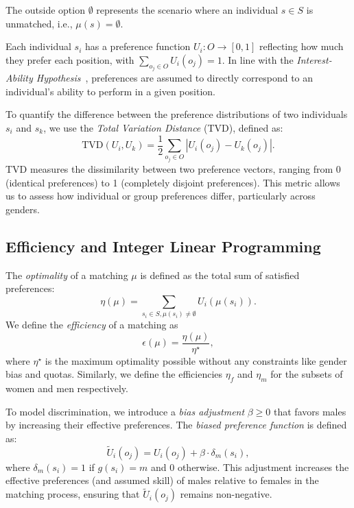 \documentclass[letterpaper]{article}
\begin{document}
The outside option \( \emptyset \) represents the scenario where an individual \( s \in S \) is unmatched, i.e., \( \mu(s) = \emptyset \).

Each individual \( s_i \) has a preference function \( U_i : O \to [0, 1] \) reflecting how much they prefer each position, with \( \sum_{o_j \in O} U_i(o_j) = 1 \). In line with the \textit{Interest-Ability Hypothesis}~\cite{jintelligence10030043}, preferences are assumed to directly correspond to an individual's ability to perform in a given position.

To quantify the difference between the preference distributions of two individuals \( s_i \) and \( s_k \), we use the \textit{Total Variation Distance} (TVD), defined as:
\[
\text{TVD}(U_i, U_k) = \frac{1}{2} \sum_{o_j \in O} \left| U_i(o_j) - U_k(o_j) \right|.
\]
TVD measures the dissimilarity between two preference vectors, ranging from 0 (identical preferences) to 1 (completely disjoint preferences). This metric allows us to assess how individual or group preferences differ, particularly across genders.

\subsection*{Efficiency and Integer Linear Programming}

The \textit{optimality} of a matching \( \mu \) is defined as the total sum of satisfied preferences:
\[
\eta(\mu) = \sum_{s_i \in S, \mu(s_i) \neq \emptyset} U_i(\mu(s_i)).
\]
We define the \textit{efficiency} of a matching as
\[
\epsilon(\mu)=\frac{\eta(\mu)}{\eta^{\star}},
\]
where \(\eta^{\star}\) is the maximum optimality possible without any constraints like gender bias and quotas. Similarly, we define the efficiencies \( \eta_f \) and \( \eta_m\) for the subsets of women and men respectively.

To model discrimination, we introduce a \textit{bias adjustment} \( \beta \geq 0 \) that favors males by increasing their effective preferences. The \textit{biased preference function} is defined as:
\[
\tilde{U}_i(o_j) = U_i(o_j) + \beta \cdot \delta_m(s_i),
\]
where \( \delta_m(s_i) = 1 \) if \( g(s_i) = m \) and \( 0 \) otherwise. This adjustment increases the effective preferences (and assumed skill) of males relative to females in the matching process, ensuring that \( \tilde{U}_i(o_j) \) remains non-negative.
\end{document}
